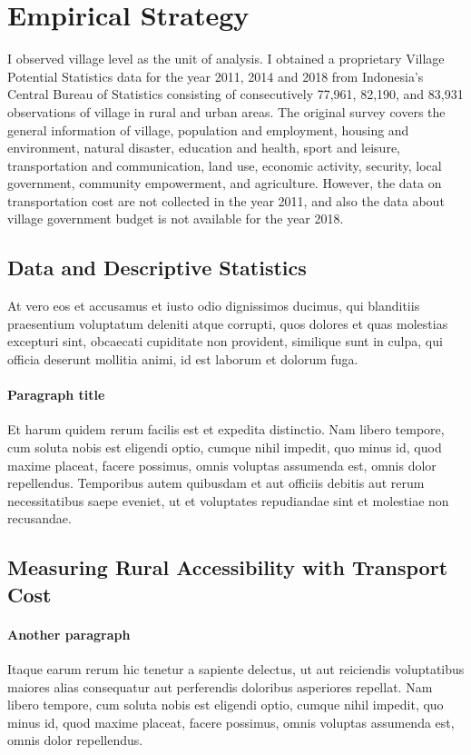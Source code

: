 \documentclass[letterpaper,12pt,leqno]{article}
\begin{document}
\section{Empirical Strategy}\label{s:strategy}

I observed village level as the unit of analysis. I obtained a proprietary Village Potential Statistics data for the year 2011, 2014 and 2018 from Indonesia's Central Bureau of Statistics consisting of consecutively 77,961, 82,190, and 83,931 observations of village in rural and urban areas. The original survey covers the general information of village, population and employment, housing and environment, natural disaster, education and health, sport and leisure, transportation and communication, land use, economic activity, security, local government, community empowerment, and agriculture. However, the data on transportation cost are not collected in the year 2011, and also the data about village government budget is not available for the year 2018. 

\subsection{Data and Descriptive Statistics}

At vero eos et accusamus et iusto odio dignissimos ducimus, qui blanditiis praesentium voluptatum deleniti atque corrupti, quos dolores et quas molestias excepturi sint, obcaecati cupiditate non provident, similique sunt in culpa, qui officia deserunt mollitia animi, id est laborum et dolorum fuga. 

\paragraph{Paragraph title} Et harum quidem rerum facilis est et expedita distinctio. Nam libero tempore, cum soluta nobis est eligendi optio, cumque nihil impedit, quo minus id, quod maxime placeat, facere possimus, omnis voluptas assumenda est, omnis dolor repellendus. Temporibus autem quibusdam et aut officiis debitis aut rerum necessitatibus saepe eveniet, ut et voluptates repudiandae sint et molestiae non recusandae. 

\subsection{Measuring Rural Accessibility with Transport Cost}

\paragraph{Another paragraph} Itaque earum rerum hic tenetur a sapiente delectus, ut aut reiciendis voluptatibus maiores alias consequatur aut perferendis doloribus asperiores repellat. Nam libero tempore, cum soluta nobis est eligendi optio, cumque nihil impedit, quo minus id, quod maxime placeat, facere possimus, omnis voluptas assumenda est, omnis dolor repellendus. 
\end{document}
